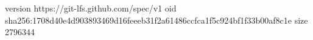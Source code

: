 version https://git-lfs.github.com/spec/v1
oid sha256:1708d40e4d903893469d16feeeb31f2a61486ccfca1f5c924bf1f33b00af8c1e
size 2796344
